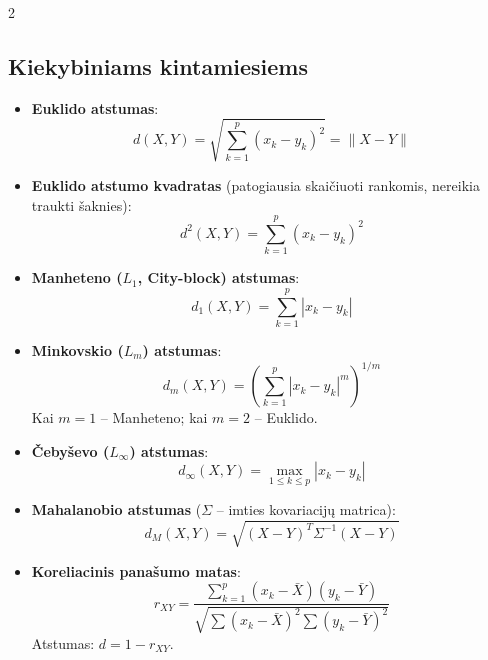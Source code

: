 \documentclass[9pt,a4paper]{article}
\begin{document}
\begin{multicols*}{2}
\subsection{Kiekybiniams kintamiesiems}
\begin{itemize}
    \item \textbf{Euklido atstumas}:
    \begin{equation*}
        d(X, Y) = \sqrt{\sum_{k=1}^p (x_k - y_k)^2} = \|X - Y\|
    \end{equation*}
    \item \textbf{Euklido atstumo kvadratas} (patogiausia skaičiuoti rankomis, nereikia traukti šaknies):
    \begin{equation*}
        d^2(X, Y) = \sum_{k=1}^p (x_k - y_k)^2
    \end{equation*}
    \item \textbf{Manheteno ($L_1$, City-block) atstumas}:
    \begin{equation*}
        d_1(X, Y) = \sum_{k=1}^p |x_k - y_k|
    \end{equation*}
    \item \textbf{Minkovskio ($L_m$) atstumas}:
    \begin{equation*}
        d_m(X, Y) = \left( \sum_{k=1}^p |x_k - y_k|^m \right)^{1/m}
    \end{equation*}
    Kai $m=1$ -- Manheteno; kai $m=2$ -- Euklido.
    \item \textbf{Čebyševo ($L_\infty$) atstumas}:
    \begin{equation*}
        d_\infty(X, Y) = \max_{1 \le k \le p} |x_k - y_k|
    \end{equation*}
    \item \textbf{Mahalanobio atstumas} ($\Sigma$ -- imties kovariacijų matrica):
    \begin{equation*}
        d_M(X, Y) = \sqrt{(X - Y)^T \Sigma^{-1} (X - Y)}
    \end{equation*}
    \item \textbf{Koreliacinis panašumo matas}:
    \begin{equation*}
        r_{XY} = \frac{\sum_{k=1}^p (x_k - \bar{X})(y_k - \bar{Y})}{\sqrt{\sum (x_k - \bar{X})^2 \sum (y_k - \bar{Y})^2}}
    \end{equation*}
    Atstumas: $d = 1 - r_{XY}$.
\end{itemize}


\end{multicols*}
\end{document}
